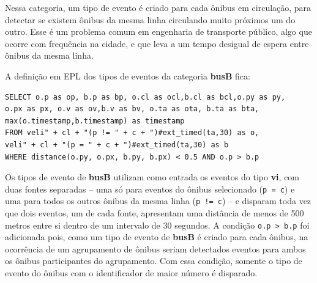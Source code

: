 \begin{itemize}
Nessa categoria, um tipo de evento é criado para cada ônibus em circulação, para detectar se existem ônibus da mesma linha circulando muito próximos um do outro. 
Esse é um problema comum em engenharia de transporte público, algo que ocorre com frequência na cidade, e que leva a um tempo desigual de espera entre ônibus da mesma linha. 

A definição em EPL dos tipos de eventos da categoria \textbf{busB} fica: 
  
\begin{verbatim}
SELECT o.p as op, b.p as bp, o.cl as ocl,b.cl as bcl,o.py as py,
o.px as px, o.v as ov,b.v as bv, o.ta as ota, b.ta as bta,
max(o.timestamp,b.timestamp) as timestamp 
FROM veli" + cl + "(p != " + c + ")#ext_timed(ta,30) as o,
veli" + cl + "(p = " + c + ")#ext_timed(ta,30) as b 
WHERE distance(o.py, o.px, b.py, b.px) < 0.5 AND o.p > b.p
\end{verbatim}
Os tipos de evento de \textbf{busB} utilizam como entrada os eventos do tipo \textbf{vi}, com duas fontes separadas -- uma só para eventos do ônibus selecionado (\texttt{p = c}) e uma para todos os outros ônibus da mesma linha (\texttt{p != c}) -- e disparam toda vez que dois eventos, um de cada fonte, apresentam uma distância de menos de 500 metros entre si dentro de um intervalo de 30 segundos. A condição \texttt{o.p > b.p} foi adicionada pois, como um tipo de evento de \textbf{busB} é criado para cada ônibus, na ocorrência de um agrupamento de ônibus seriam detectados eventos para ambos os ônibus participantes do agrupamento. Com essa condição, somente o tipo de evento do ônibus com o identificador de maior número é disparado.

\end{itemize}





